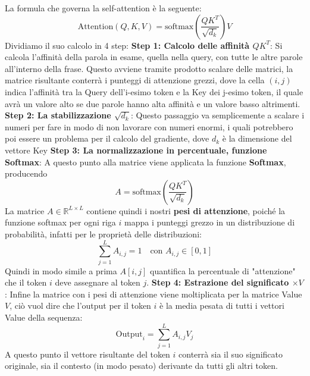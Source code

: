 \documentclass{article}
\begin{document}
La formula che governa la self-attention è la seguente:
$$
\text{Attention}(Q, K, V) = \text{softmax}\left(\frac{Q K^T}{\sqrt{d_k}}\right) V 
$$
Dividiamo il suo calcolo in 4 step: \newline
\textbf{Step 1: Calcolo delle affinità $QK^T$}: Si calcola l'affinità della parola in esame, quella nella query, con tutte le altre parole all'interno della frase. Questo avviene tramite prodotto scalare delle matrici, la matrice risultante conterrà i punteggi di attenzione grezzi, dove la cella $(i,j)$ indica l'affinità tra la Query dell'i-esimo token e la Key dei j-esimo token, il quale avrà un valore alto se due parole hanno alta affinità e un valore basso altrimenti. \newline
\textbf{Step 2: La stabilizzazione $\sqrt{d_k}$}: Questo passaggio va semplicemente a scalare i numeri per fare in modo di non lavorare con numeri enormi, i quali potrebbero poi essere un problema per il calcolo del gradiente, dove $d_k$ è la dimensione del vettore Key \newline
\textbf{Step 3: La normalizzazione in percentuale, funzione Softmax}: A questo punto alla matrice viene applicata la funzione \textbf{Softmax}, producendo $$A = \text{softmax}\left(\frac{Q K^T}{\sqrt{d_k}}\right)$$ 
La matrice $A \in \mathbb{R}^{L \times L}$ contiene quindi i nostri \textbf{pesi di attenzione}, poiché la funzione softmax per ogni riga $i$ mappa i punteggi grezzo in un distribuzione di probabilità, infatti per le proprietà delle distribuzioni: $$\sum_{j=1}^{L} A_{i, j} = 1 \quad \text{con } A_{i, j} \in [0, 1]$$ Quindi in modo simile a prima $A[i,j]$ quantifica la percentuale di "attenzione" che il token $i$ deve assegnare al token $j$.\newline
\textbf{Step 4: Estrazione del significato $\times V$}: Infine la matrice con i pesi di attenzione viene moltiplicata per la matrice Value $V$, ciò vuol dire che l'output per il token $i$ è la media pesata di tutti i vettori Value della sequenza: $$\text{Output}_i = \sum_{j=1}^{L} A_{i, j} V_j$$ 
A questo punto il vettore risultante del token $i$ conterrà sia il suo significato originale, sia il contesto (in modo pesato) derivante da tutti gli altri token.
\end{document}
